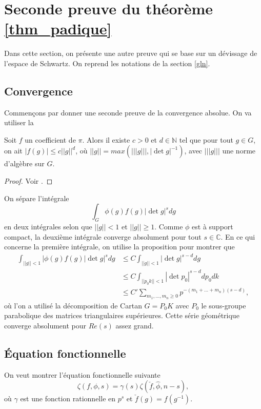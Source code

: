 \section{Seconde preuve du théorème \ref{thm_padique}}

Dans cette section, on présente une autre preuve qui se base sur un dévissage de l'espace de Schwartz. On reprend les notations de la section \ref{gln}. 

\subsection{Convergence}

Commençons par donner une seconde preuve de la convergence absolue. On va utiliser la
\begin{proposition}
Soit $f$ un coefficient de $\pi$. Alors il existe $c > 0$ et $d \in \mathbb{N}$ tel que pour tout $g \in G$, on ait $|f(g)| \leq c ||g||^d$, où $||g|| = max(|||g|||, |\det g|^{-1})$, avec $|||g|||$ une norme d'algèbre sur $G$.
\end{proposition}

\begin{proof}
Voir \cite[Corollaire I.4.4]{waldspurger}.
\end{proof}

On sépare l'intégrale
\begin{equation}
\int_G \phi(g)f(g)|\det g|^s dg
\end{equation}
en deux intégrales selon que $||g|| < 1$ et $||g|| \geq 1$. Comme $\phi$ est à support compact, la deuxième intégrale converge absolument pour tout $s \in \mathbb{C}$. En ce qui concerne la première intégrale, on utilise la proposition pour montrer que
\begin{align}
\int_{||g|| < 1}|\phi(g)f(g)|\det g|^s dg &\leq C \int_{||g|| < 1} |\det g|^{s-d} dg \\
&\leq C \int_{||p_0k|| < 1} |\det p_0|^{s-d}dp_0dk \\
&\leq C' \sum_{m_1, ..., m_n \geq 0} p^{-(m_1+...+m_n)(s-d)},
\end{align}
où l'on a utilisé la décomposition de Cartan $G=P_0K$ avec $P_0$ le sous-groupe parabolique des matrices triangulaires supérieures. Cette série géométrique converge absolument pour $Re(s)$ assez grand.

\subsection{Équation fonctionnelle}
On veut montrer l'équation fonctionnelle suivante
\begin{equation}
\zeta(f, \phi, s) = \gamma(s) \zeta(\check{f}, \hat{\phi}, n-s),
\end{equation}
où $\gamma$ est une fonction rationnelle en $p^s$ et $\check{f}(g) = f(g^{-1})$.

